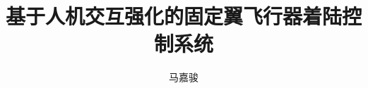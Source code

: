 \documentclass[12pt,a4paper]{ctexbook}
\begin{document}
\title{基于人机交互强化的固定翼飞行器着陆控制系统}
\author{马嘉骏}
\date{}
\maketitle

\tableofcontents










\end{document}
